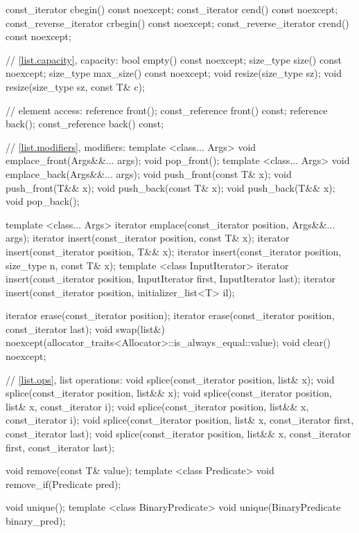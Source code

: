 \begin{codeblock}
{{    const_iterator         cbegin() const noexcept;
    const_iterator         cend() const noexcept;
    const_reverse_iterator crbegin() const noexcept;
    const_reverse_iterator crend() const noexcept;

    // \ref{list.capacity}, capacity:
    bool      empty() const noexcept;
    size_type size() const noexcept;
    size_type max_size() const noexcept;
    void      resize(size_type sz);
    void      resize(size_type sz, const T& c);

    // element access:
    reference       front();
    const_reference front() const;
    reference       back();
    const_reference back() const;

    // \ref{list.modifiers}, modifiers:
    template <class... Args> void emplace_front(Args&&... args);
    void pop_front();
    template <class... Args> void emplace_back(Args&&... args);
    void push_front(const T& x);
    void push_front(T&& x);
    void push_back(const T& x);
    void push_back(T&& x);
    void pop_back();

    template <class... Args> iterator emplace(const_iterator position, Args&&... args);
    iterator insert(const_iterator position, const T& x);
    iterator insert(const_iterator position, T&& x);
    iterator insert(const_iterator position, size_type n, const T& x);
    template <class InputIterator>
      iterator insert(const_iterator position, InputIterator first,
                      InputIterator last);
    iterator insert(const_iterator position, initializer_list<T> il);

    iterator erase(const_iterator position);
    iterator erase(const_iterator position, const_iterator last);
    void     swap(list&)
      noexcept(allocator_traits<Allocator>::is_always_equal::value);
    void     clear() noexcept;

    // \ref{list.ops}, list operations:
    void splice(const_iterator position, list& x);
    void splice(const_iterator position, list&& x);
    void splice(const_iterator position, list& x, const_iterator i);
    void splice(const_iterator position, list&& x, const_iterator i);
    void splice(const_iterator position, list& x,
                const_iterator first, const_iterator last);
    void splice(const_iterator position, list&& x,
                const_iterator first, const_iterator last);

    void remove(const T& value);
    template <class Predicate> void remove_if(Predicate pred);

    void unique();
    template <class BinaryPredicate>
      void unique(BinaryPredicate binary_pred);

}}
\end{codeblock}
